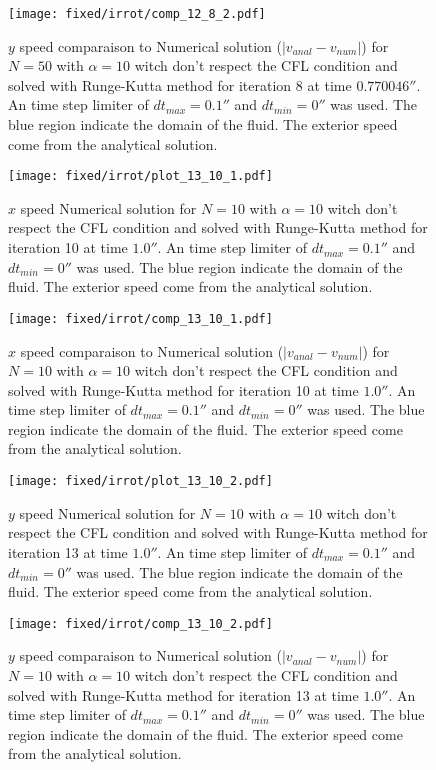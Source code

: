 \begin{figure}
\texttt{[image: fixed/irrot/comp\_12\_8\_2.pdf]}
\caption{$y$ speed comparaison to Numerical solution ($|v_{anal}-v_{num}|$) for $N=50$ with $\alpha=10$ witch don't respect the CFL condition and solved with Runge-Kutta method
for iteration 8 at time $\unit{0.770046}{\second}$.
An time step limiter of $dt_{max}=\unit{0.1}{\second}$ and $dt_{min}=\unit{0}{\second}$ was used.
The blue region indicate the domain of the fluid. The exterior speed come from the analytical solution.
\label{fix:comp_12_8_2}
}
\end{figure}

\clearpage

\begin{figure}
\texttt{[image: fixed/irrot/plot\_13\_10\_1.pdf]}
\caption{$x$ speed Numerical solution for $N=10$ with $\alpha=10$ witch don't respect the CFL condition and solved with Runge-Kutta method
for iteration 10 at time $\unit{1.0}{\second}$.
An time step limiter of $dt_{max}=\unit{0.1}{\second}$ and $dt_{min}=\unit{0}{\second}$ was used.
The blue region indicate the domain of the fluid. The exterior speed come from the analytical solution.
\label{fix:plot_13_10_1}
}
\end{figure}

\begin{figure}
\texttt{[image: fixed/irrot/comp\_13\_10\_1.pdf]}
\caption{$x$ speed comparaison to Numerical solution ($|v_{anal}-v_{num}|$) for $N=10$ with $\alpha=10$ witch don't respect the CFL condition and solved with Runge-Kutta method
for iteration 10 at time $\unit{1.0}{\second}$.
An time step limiter of $dt_{max}=\unit{0.1}{\second}$ and $dt_{min}=\unit{0}{\second}$ was used.
The blue region indicate the domain of the fluid. The exterior speed come from the analytical solution.
\label{fix:comp_13_10_1}
}
\end{figure}

\begin{figure}
\texttt{[image: fixed/irrot/plot\_13\_10\_2.pdf]}
\caption{$y$ speed Numerical solution for $N=10$ with $\alpha=10$ witch don't respect the CFL condition and solved with Runge-Kutta method
for iteration 13 at time $\unit{1.0}{\second}$.
An time step limiter of $dt_{max}=\unit{0.1}{\second}$ and $dt_{min}=\unit{0}{\second}$ was used.
The blue region indicate the domain of the fluid. The exterior speed come from the analytical solution.
\label{fix:plot_13_10_2}
}
\end{figure}

\begin{figure}
\texttt{[image: fixed/irrot/comp\_13\_10\_2.pdf]}
\caption{$y$ speed comparaison to Numerical solution ($|v_{anal}-v_{num}|$) for $N=10$ with $\alpha=10$ witch don't respect the CFL condition and solved with Runge-Kutta method
for iteration 13 at time $\unit{1.0}{\second}$.
An time step limiter of $dt_{max}=\unit{0.1}{\second}$ and $dt_{min}=\unit{0}{\second}$ was used.
The blue region indicate the domain of the fluid. The exterior speed come from the analytical solution.
\label{fix:comp_13_10_2}
}
\end{figure}

